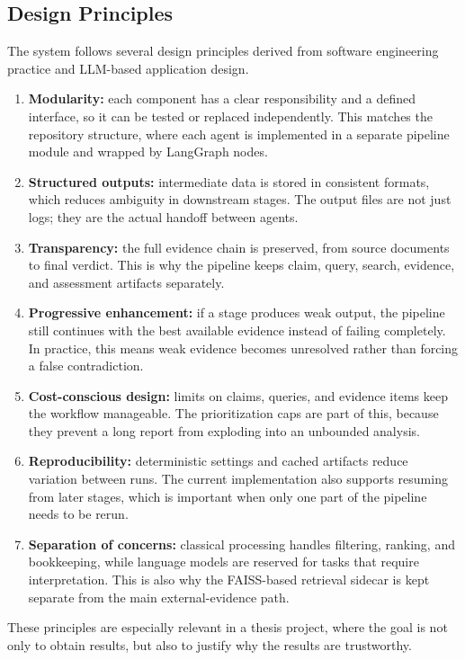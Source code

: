 \subsection{Design Principles}

The system follows several design principles derived from software engineering practice and LLM-based application design.

\begin{enumerate}
    \item \textbf{Modularity:} each component has a clear responsibility and a defined interface, so it can be tested or replaced independently. This matches the repository structure, where each agent is implemented in a separate pipeline module and wrapped by LangGraph nodes.
    \item \textbf{Structured outputs:} intermediate data is stored in consistent formats, which reduces ambiguity in downstream stages. The output files are not just logs; they are the actual handoff between agents.
    \item \textbf{Transparency:} the full evidence chain is preserved, from source documents to final verdict. This is why the pipeline keeps claim, query, search, evidence, and assessment artifacts separately.
    \item \textbf{Progressive enhancement:} if a stage produces weak output, the pipeline still continues with the best available evidence instead of failing completely. In practice, this means weak evidence becomes unresolved rather than forcing a false contradiction.
    \item \textbf{Cost-conscious design:} limits on claims, queries, and evidence items keep the workflow manageable. The prioritization caps are part of this, because they prevent a long report from exploding into an unbounded analysis.
    \item \textbf{Reproducibility:} deterministic settings and cached artifacts reduce variation between runs. The current implementation also supports resuming from later stages, which is important when only one part of the pipeline needs to be rerun.
    \item \textbf{Separation of concerns:} classical processing handles filtering, ranking, and bookkeeping, while language models are reserved for tasks that require interpretation. This is also why the FAISS-based retrieval sidecar is kept separate from the main external-evidence path.
\end{enumerate}

These principles are especially relevant in a thesis project, where the goal is not only to obtain results, but also to justify why the results are trustworthy.


